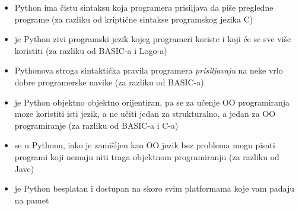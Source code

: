 	\begin{itemize}
		\item Python ima čistu sintaksu koja programera prisiljava da piše
			pregledne programe (za razliku od kriptične sintakse programskog jezika
			C)
		\item je Python zivi programski jezik kojeg programeri koriste i koji će
			se sve više koristiti (za razliku od BASIC-a i Logo-a)
		\item Pythonova stroga sintaktička pravila programera \emph{prisiljavaju} na
			neke vrlo dobre programerske navike (za razliku od BASIC-a)
		\item je Python objektno objektno orijentiran, pa se za učenje OO programiranja
			moze koristiti isti jezik, a ne učiti jedan za strukturalno, a jedan
			za OO programiranje (za razliku od BASIC-a i C-a)
		\item se u Pythonu, iako je zamišljen kao OO jezik bez problema mogu pisati 
			programi koji nemaju niti traga objektnom programiranju (za razliku od Jave)
		\item je Python besplatan i dostupan na skoro svim platformama koje vam padaju
			na pamet
	\end{itemize}
